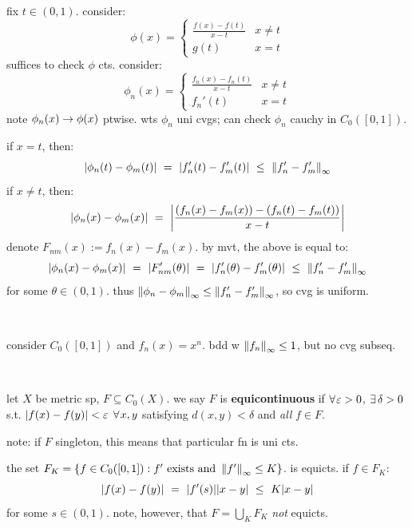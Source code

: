 \begin{pf}[source=Primary Source Material]
    fix $t\in(0,1)$. consider:
	\begin{equation*}
		\phi(x) =
		\begin{cases}
			\frac{f(x)-f(t)}{x-t} & x \neq t \\ g(t) & x = t
		\end{cases}
	\end{equation*}
	suffices to check $\phi$ cts. consider:
	\begin{equation*}
		\phi_{n}(x) =
		\begin{cases}
			\frac{f_{n}(x)-f_{n}(t)}{x-t} & x \neq t \\ f_{n}'(t) & x = t
		\end{cases}
	\end{equation*}
	note $\phi_{n}(x)\rightarrow\phi(x)$ ptwise.
	wts $\phi_{n}$ uni cvgs; can check $\phi_{n}$ cauchy in $C_{0}([0,1])$.

	if $x=t$, then:
	\begin{equation*}
	    \abs{\phi_{n}(t)-\phi_{m}(t)}
		\ = \ \abs{f_{n}'(t)-f_{m}'(t)}
		\ \leq \ \left\|f_{n}'-f_{m}'\right\|_{\infty}
	\end{equation*}
	if $x\neq t$, then:
	\begin{equation*}
		\abs{\phi_{n}(x)-\phi_{m}(x)} \ = \
		\abs{\frac{(f_{n}(x)-f_{m}(x))-(f_{n}(t)-f_{m}(t))}{x-t}}
	\end{equation*}
	denote $F_{nm}(x):=f_{n}(x)-f_{m}(x)$. by mvt, the above is equal to:
	\begin{equation*}
	    \abs{\phi_{n}(x)-\phi_{m}(x)}
		\ = \ \abs{F_{nm}'(\theta)}
		\ = \ \abs{f_{n}'(\theta)-f_{m}'(\theta)}
		\ \leq \ \left\|f_{n}'-f_{m}'\right\|_{\infty}
	\end{equation*}
	for some $\theta\in(0,1)$.
	thus $\left\|\phi_{n}-\phi_{m}\right\|_{\infty}\leq\left\|f_{n}'-f_{m}'\right\|_{\infty}$,
	so cvg is uniform.
\end{pf} \

\begin{xmp}[source=Primary Source Material]
    consider $C_{0}([0,1])$ and $f_{n}(x)=x^{n}$.
	bdd w $\left\|f_{n}\right\|_{\infty}\leq1$, but no cvg subseq.
\end{xmp} \

\begin{defn}
    let $X$ be metric sp, $F\subseteq C_{0}(X)$.
	we say $F$ is \textbf{equicontinuous} if $\fa\ep>0$, $\ex\delta>0$ s.t.
	$\abs{f(x)-f(y)}<\varepsilon$ $\fa x,y$ satisfying $d(x,y)<\delta$ and \textit{all} $f\in F$.
\end{defn}
note: if $F$ singleton, this means that particular fn is uni cts.

\begin{xmp}[source=Primary Source Material]
    the set $F_{K}=\left\{{f\in C_{0}([0,1]) : f' \textrm{ exists and } \left\|f'\right\|_{\infty}\leq K}\right\}$.
	is equicts. if $f\in F_{K}$:
	\begin{equation*}
	    \abs{f(x)-f(y)} \ = \ \abs{f'(s)}\abs{x-y} \ \leq \ K\abs{x-y}
	\end{equation*}
	for some $s\in(0,1)$. note, however, that $F=\bigcup_{K}F_{K}$ \textit{not} equicts.
\end{xmp}



